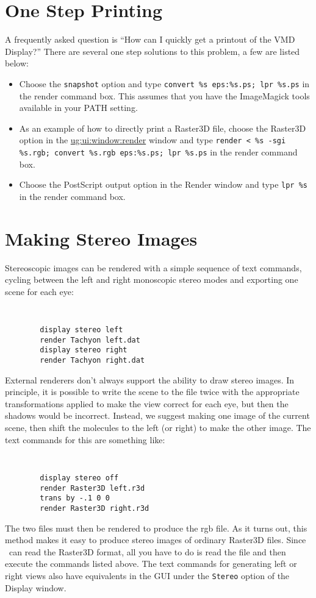\section{One Step Printing}
A frequently asked question is ``How can I quickly get a printout of
the VMD Display?'' There are several one step solutions to this
problem, a few are listed below:
\begin{itemize}
\item Choose the {\tt snapshot} option and type 
      {\tt convert \%s eps:\%s.ps; lpr \%s.ps} 
      in the render command box.  This assumes that you have the
      ImageMagick tools available in your PATH setting.
\item As an example of how to directly print a Raster3D file, choose the
      Raster3D option  in the \hyperref{{\sf Render}}{{\sf
      Render}[\S~}{]}{ug:ui:window:render} window and type
      {\tt  render < \%s -sgi \%s.rgb; convert \%s.rgb eps:\%s.ps; lpr \%s.ps} 
      in the render command box.
\item Choose the PostScript output option in the {\sf Render} window and type
      {\tt lpr \%s} in the render command box.
\end{itemize}


\section{Making Stereo Images}
Stereoscopic images can be rendered with a simple sequence 
of text commands, cycling between the left and right monoscopic 
stereo modes and exporting one scene for each eye:
{\tt
\begin{verbatim}
        display stereo left
        render Tachyon left.dat
        display stereo right
        render Tachyon right.dat
\end{verbatim}
}

External renderers don't always support the ability to draw stereo images.  
In principle, it is possible to write the scene to the file twice with the
appropriate transformations applied to make the view correct for each
eye, but then the shadows would be incorrect.
Instead, we suggest making one image of the current scene, then shift
the molecules to the left (or right) to make the other image.  
The text commands for this are something like:
{\tt
\begin{verbatim}
        display stereo off
        render Raster3D left.r3d
        trans by -.1 0 0
        render Raster3D right.r3d
\end{verbatim}
}
\noindent The two files must then be rendered to produce the rgb file.
As it turns out, this method makes it easy to produce stereo images of
ordinary Raster3D files.  Since \VMD\ can read the Raster3D format,
all you have to do is read the file and then execute the commands listed
above.  The text commands for generating left or right views also have
equivalents in the GUI under the {\tt Stereo} option of the Display window.


